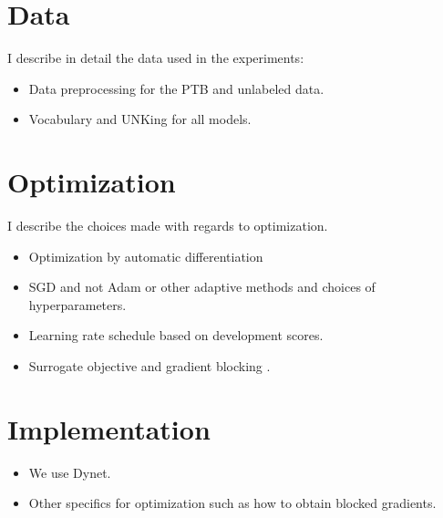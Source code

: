 % 

\section{Data}
I describe in detail the data used in the experiments:
\begin{itemize}
  \item Data preprocessing for the PTB and unlabeled data.
  \item Vocabulary and UNKing for all models.
\end{itemize}

\section{Optimization}
I describe the choices made with regards to optimization.
\begin{itemize}
  \item Optimization by automatic differentiation \citep{Blei+2016:VI}
  \item SGD and not Adam or other adaptive methods \citep{stern2017minimal} and choices of hyperparameters.
  \item Learning rate schedule based on development scores.
  \item Surrogate objective and gradient blocking \cite{schulman2015gradient}.
\end{itemize}

\section{Implementation}
\begin{itemize}
  \item We use Dynet.
  \item Other specifics for optimization such as how to obtain blocked gradients.
\end{itemize}
